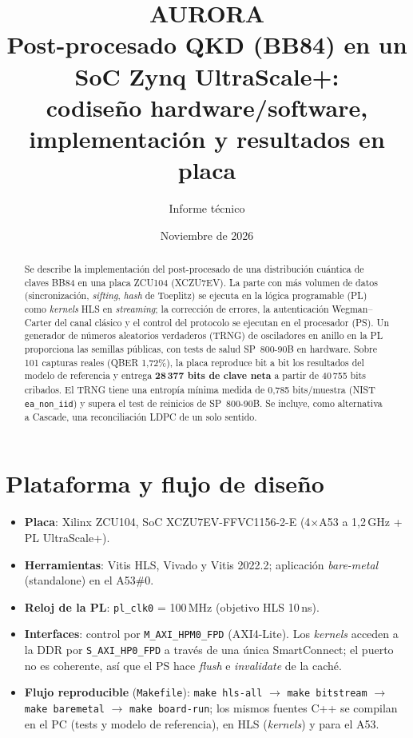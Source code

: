 \documentclass[a4paper,11pt]{article}
\title{\textbf{AURORA}\\[2pt]\large Post-procesado QKD (BB84) en un SoC Zynq UltraScale+:\\
codiseño hardware/software, implementación y resultados en placa}
\author{Informe técnico}
\date{Noviembre de 2026}
\newcommand{\code}[1]{\texttt{#1}}
\begin{document}
\maketitle

\begin{abstract}
\noindent
Se describe la implementación del post-procesado de una distribución cuántica
de claves BB84 en una placa ZCU104 (XCZU7EV). La parte con más volumen de datos
(sincronización, \emph{sifting}, \emph{hash} de Toeplitz) se ejecuta en la
lógica programable (PL) como \emph{kernels} HLS en \emph{streaming}; la
corrección de errores, la autenticación Wegman--Carter del canal clásico y el
control del protocolo se ejecutan en el procesador (PS). Un generador de
números aleatorios verdaderos (TRNG) de osciladores en anillo en la PL
proporciona las semillas públicas, con tests de salud SP~800-90B en hardware.
Sobre 101 capturas reales (QBER 1,72\%), la placa reproduce bit a bit los
resultados del modelo de referencia y entrega \textbf{28\,377 bits de clave
neta} a partir de 40\,755 bits cribados. El TRNG tiene una entropía mínima
medida de 0,785 bits/muestra (NIST \code{ea\_non\_iid}) y supera el test de
reinicios de SP~800-90B. Se incluye, como alternativa a Cascade, una
reconciliación LDPC de un solo sentido.
\end{abstract}

\tableofcontents

\section{Plataforma y flujo de diseño}

\begin{itemize}
  \item \textbf{Placa}: Xilinx ZCU104, SoC XCZU7EV-FFVC1156-2-E (4$\times$A53 a 1,2\,GHz + PL UltraScale+).
  \item \textbf{Herramientas}: Vitis HLS, Vivado y Vitis 2022.2; aplicación \emph{bare-metal} (standalone) en el A53\#0.
  \item \textbf{Reloj de la PL}: \code{pl\_clk0} = 100\,MHz (objetivo HLS 10\,ns).
  \item \textbf{Interfaces}: control por \code{M\_AXI\_HPM0\_FPD} (AXI4-Lite). Los \emph{kernels} acceden a la DDR por
        \code{S\_AXI\_HP0\_FPD} a través de una única SmartConnect; el puerto no es coherente, así que el PS
        hace \emph{flush} e \emph{invalidate} de la caché.
  \item \textbf{Flujo reproducible} (\code{Makefile}): \code{make hls-all} $\rightarrow$ \code{make bitstream}
        $\rightarrow$ \code{make baremetal} $\rightarrow$ \code{make board-run}; los mismos fuentes C++ se compilan en el PC
        (tests y modelo de referencia), en HLS (\emph{kernels}) y para el A53.
\end{itemize}
\end{document}

